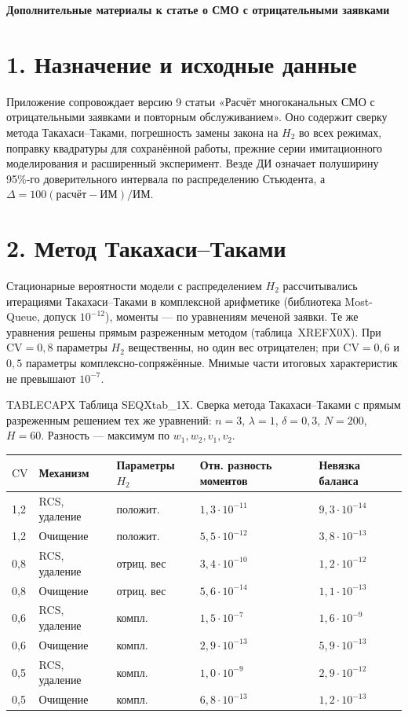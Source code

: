 
\begin{center}\Large\bfseries Дополнительные материалы к статье о СМО с отрицательными заявками\end{center}
\section*{1. Назначение и исходные данные}
Приложение сопровождает версию 9 статьи «Расчёт многоканальных СМО с отрицательными заявками и повторным обслуживанием». Оно содержит сверку метода Такахаси--Таками, погрешность замены закона на \(H_2\) во всех режимах, поправку квадратуры для сохранённой работы, прежние серии имитационного моделирования и расширенный эксперимент. Везде ДИ означает полуширину 95\%-го доверительного интервала по распределению Стьюдента, а \(\Delta=100(\text{расчёт}-\text{ИМ})/\text{ИМ}\).

\section*{2. Метод Такахаси--Таками}
Стационарные вероятности модели с распределением \(H_2\) рассчитывались итерациями Такахаси--Таками в комплексной арифметике (библиотека Most-Queue, допуск \(10^{-12}\)), моменты --- по уравнениям меченой заявки. Те же уравнения решены прямым разреженным методом (таблица~XREFX0X). При \(\mathrm{CV}=0{,}8\) параметры \(H_2\) вещественны, но один вес отрицателен; при \(\mathrm{CV}=0{,}6\) и \(0{,}5\) параметры комплексно-сопряжённые. Мнимые части итоговых характеристик не превышают \(10^{-7}\).

\noindent TABLECAPX Таблица SEQXtab_1X. Сверка метода Такахаси--Таками с прямым разреженным решением тех же уравнений: \(n=3\), \(\lambda=1\), \(\delta=0{,}3\), \(N=200\), \(H=60\). Разность --- максимум по \(w_1,w_2,v_1,v_2\).\par

\setlength{\tabcolsep}{2pt}
\begin{tabular}{p{1.2cm}p{4.2cm}p{2.6cm}p{3.6cm}p{3.6cm}}
\toprule
$\mathrm{CV}$ & Механизм & Параметры $H_2$ & Отн. разность моментов & Невязка баланса \\
\midrule
1,2 & RCS, удаление & положит. & \(1{,}3\cdot10^{-11}\) & \(9{,}3\cdot10^{-14}\) \\
1,2 & Очищение & положит. & \(5{,}5\cdot10^{-12}\) & \(3{,}8\cdot10^{-13}\) \\
0,8 & RCS, удаление & отриц. вес & \(3{,}4\cdot10^{-10}\) & \(1{,}2\cdot10^{-12}\) \\
0,8 & Очищение & отриц. вес & \(5{,}6\cdot10^{-14}\) & \(1{,}1\cdot10^{-13}\) \\
0,6 & RCS, удаление & компл. & \(1{,}5\cdot10^{-7}\) & \(1{,}6\cdot10^{-9}\) \\
0,6 & Очищение & компл. & \(2{,}9\cdot10^{-13}\) & \(5{,}9\cdot10^{-13}\) \\
0,5 & RCS, удаление & компл. & \(1{,}0\cdot10^{-9}\) & \(2{,}9\cdot10^{-12}\) \\
0,5 & Очищение & компл. & \(6{,}8\cdot10^{-13}\) & \(1{,}2\cdot10^{-13}\) \\
\bottomrule
\end{tabular}




